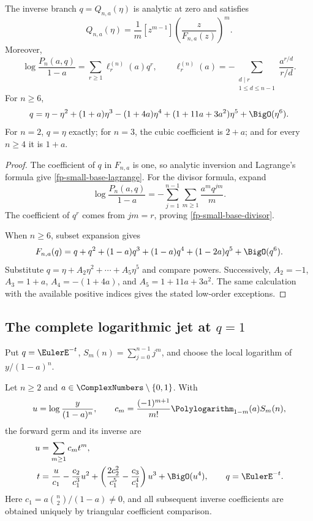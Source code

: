 \begin{theorem}[Exact coefficient engine at \(q=0\)]
\label{fp-small-base-engine}
The inverse branch \(q=Q_{n,a}(\eta)\) is analytic at zero and satisfies
\begin{equation}
 [\eta^m]Q_{n,a}(\eta)=\frac1m[z^{m-1}]
 \left(\frac{z}{F_{n,a}(z)}\right)^m.
 \label{fp-small-base-lagrange}
\end{equation}
Moreover,
\begin{equation}
 \log\frac{P_n(a,q)}{1-a}=\sum_{r\geq1}\ell_r^{(n)}(a)q^r,\qquad
 \ell_r^{(n)}(a)=
 -\sum_{\substack{d\mid r\\1\leq d\leq n-1}}
 \frac{a^{r/d}}{r/d}.
 \label{fp-small-base-divisor}
\end{equation}
For \(n\geq6\),
\begin{equation}
 q=\eta-\eta^2+(1+a)\eta^3-(1+4a)\eta^4
 +(1+11a+3a^2)\eta^5+\BigO(\eta^6).
 \label{fp-small-base-five}
\end{equation}
For \(n=2\), \(q=\eta\) exactly; for \(n=3\), the cubic coefficient is
\(2+a\); and for every \(n\geq4\) it is \(1+a\).
\end{theorem}

\begin{proof}
The coefficient of \(q\) in \(F_{n,a}\) is one, so analytic inversion and
Lagrange's formula give \cref{fp-small-base-lagrange}.  For the divisor
formula, expand
\[
 \log\frac{P_n(a,q)}{1-a}
 =-\sum_{j=1}^{n-1}\sum_{m\geq1}\frac{a^mq^{jm}}m.
\]
The coefficient of \(q^r\) comes from \(jm=r\), proving
\cref{fp-small-base-divisor}.

When \(n\geq6\), subset expansion gives
\[
 F_{n,a}(q)=q+q^2+(1-a)q^3+(1-a)q^4+(1-2a)q^5+\BigO(q^6).
\]
Substitute \(q=\eta+A_2\eta^2+\cdots+A_5\eta^5\) and compare powers.
Successively,
\(A_2=-1\), \(A_3=1+a\), \(A_4=-(1+4a)\), and
\(A_5=1+11a+3a^2\).  The same calculation with the available positive
indices gives the stated low-order exceptions.
\end{proof}

\subsection{The complete logarithmic jet at \(q=1\)}

Put \(q=\EulerE^{-t}\), \(S_m(n)=\sum_{j=0}^{n-1}j^m\), and choose the local
logarithm of \(y/(1-a)^n\).

\begin{theorem}[All-order regular base inverse at \(q=1\)]
\label{fp-unit-base-inverse}
Let \(n\geq2\) and \(a\in\ComplexNumbers\setminus\{0,1\}\).  With
\[
 u=\log\frac{y}{(1-a)^n},\qquad
 c_m=\frac{(-1)^{m+1}}{m!}\Polylogarithm_{1-m}(a)S_m(n),
\]
the forward germ and its inverse are
\begin{align}
 u&=\sum_{m\geq1}c_mt^m,
 \label{fp-unit-base-forward}\\
 t&=\frac{u}{c_1}-\frac{c_2}{c_1^3}u^2
 +\left(\frac{2c_2^2}{c_1^5}-\frac{c_3}{c_1^4}\right)u^3
 +\BigO(u^4),\qquad q=\EulerE^{-t}.
 \label{fp-unit-base-reverse}
\end{align}
Here \(c_1=a\binom n2/(1-a)\ne0\), and all subsequent inverse coefficients
are obtained uniquely by triangular coefficient comparison.
\end{theorem}

